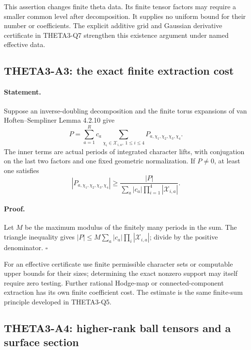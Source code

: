 \documentclass[11pt]{article}
\theoremstyle{definition}\newtheorem{definition}[theorem]{Definition}\newtheorem{remark}[theorem]{Remark}
\begin{document}
This assertion changes finite theta data. Its finite tensor factors
may require a smaller common level after decomposition. It supplies
no uniform bound for their number or coefficients. The explicit
additive grid and Gaussian derivative certificate in THETA3-Q7
strengthen this existence argument under named effective data.

\subsection{THETA3-A3: the exact finite extraction cost}\label{A3}

\paragraph{Statement.}
Suppose an inverse-doubling decomposition and the finite torus
expansions of van Hoften--Sempliner Lemma 4.2.10 give
\[
 P=\sum_{a=1}^{R}c_a
       \sum_{\chi_i\in\mathcal X_{i,a},\ 1\leq i\leq4}
                       P_{a,\chi_1,\chi_2,\chi_3,\chi_4}.
\]
The inner terms are actual periods of integrated character lifts, with
conjugation on the last two factors and one fixed geometric
normalization. If $P\ne0$, at least one satisfies
\[
 |P_{a,\chi_1,\chi_2,\chi_3,\chi_4}|
 \geq \frac{|P|}{\sum_a|c_a|\prod_{i=1}^4|\mathcal X_{i,a}|}.
\]

\paragraph{Proof.}
Let $M$ be the maximum modulus of the finitely many periods in the
sum. The triangle inequality gives
$|P|\leq M\sum_a|c_a|\prod_i|\mathcal X_{i,a}|$; divide by the
positive denominator. $\square$

For an effective certificate use finite permissible character sets or
computable upper bounds for their sizes; determining the exact nonzero
support may itself require zero testing. Further rational Hodge-map or
connected-component extraction has its own finite coefficient cost.
The estimate is the same finite-sum principle developed in THETA3-Q5.

\subsection{THETA3-A4: higher-rank ball tensors and a surface section}\label{A4}
\end{document}
